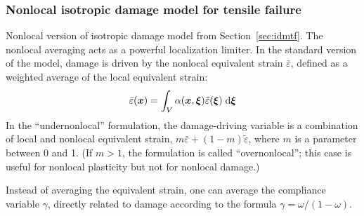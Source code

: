 \documentclass[a4paper]{article}
\newcommand{\mbf}[1]{\mbox{\boldmath$#1$}}
\begin{document}
\subsubsection{Nonlocal isotropic damage model for tensile failure}
\label{sec:nidm}
Nonlocal version of isotropic damage model from Section~\ref{sec:idmtf}.
The nonlocal averaging acts as a powerful localization
limiter. 
In the standard version of the model, 
damage is driven by the nonlocal equivalent strain $\bar\varepsilon$, 
defined as a weighted average of the local equivalent strain:
$$
\bar\varepsilon(\mbf{x}) = \int_V\alpha(\mbf{x},\mbf{\xi})\tilde\varepsilon(\mbf{\xi})\;{\rm d}\mbf{\xi}
$$
In the ``undernonlocal'' formulation, the damage-driving variable is a 
combination of local and nonlocal equivalent strain, 
$m\bar\varepsilon+(1-m)\tilde\varepsilon$, where $m$ is a parameter between
0 and 1. (If $m>1$, the formulation is called ``overnonlocal''; this case
is useful for nonlocal plasticity but not for nonlocal damage.) 

Instead
of averaging the equivalent strain, one can average the compliance variable
$\gamma$, directly related to damage according to the formula 
$\gamma=\omega/(1-\omega)$.
\end{document}
